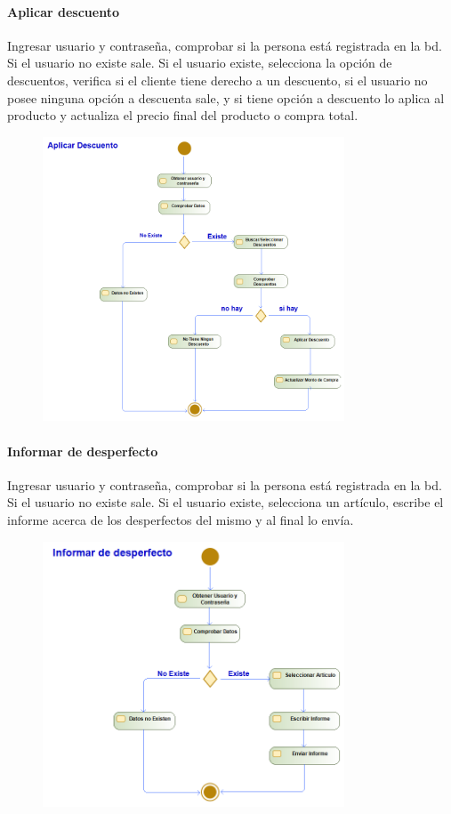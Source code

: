 \paragraph{Aplicar descuento}
Ingresar usuario y contraseña, comprobar si la persona está registrada en la \gls{bd}. Si el usuario no existe sale. Si el usuario existe, selecciona la opción de descuentos, verifica si el cliente tiene derecho a un descuento, si el usuario no posee ninguna opción a descuenta sale, y si tiene opción a descuento lo aplica al producto y actualiza el precio final del producto o compra total.
\begin{figure}[H]
    \centering
    \includegraphics[width=0.8\textwidth]{Use_Cases/aplicar_descuento.png}
\end{figure}
\newpage
\paragraph{Informar de desperfecto}
Ingresar usuario y contraseña, comprobar si la persona está registrada en la \gls{bd}. Si el usuario no existe sale. Si el usuario existe, selecciona un artículo, escribe el informe acerca de los desperfectos del mismo y al final lo envía.
\begin{figure}[H]
    \centering
    \includegraphics[width=0.8\textwidth]{Use_Cases/informar_de_desperfecto.png}
\end{figure}
\newpage
